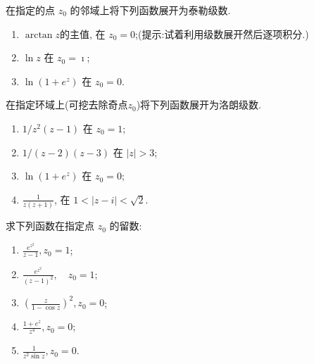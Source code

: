 \documentclass[10pt]{article}
\newenvironment{problem}[2][]{\begin{trivlist}
\item[\hskip \labelsep {\bfseries #1}\hskip \labelsep {\bfseries #2}]}{\end{trivlist}}
\begin{document}
\renewcommand{\labelenumi}{(\arabic{enumi})}
\renewcommand{\labelenumii}{(\arabic{enumi}.\arabic{enumii})}



 


\begin{problem}{4.1}
  在指定的点 $z_0$ 的邻域上将下列函数展开为泰勒级数.
  \begin{enumerate}
    \item $\arctan z$的主值, 在 $z_0=0$;(提示:试着利用级数展开然后逐项积分.)
    \item $\ln z$ 在 $z_0=\imath$;
    \item $\ln \left(1+e^z\right)$ 在 $z_0=0$.
  \end{enumerate}
\end{problem}

\begin{problem}{4.2}
  在指定环域上(可挖去除奇点$z_0$)将下列函数展开为洛朗级数.
  \begin{enumerate}
    \item$1 / z^2(z-1)$ 在 $z_0=1$;
    \item $1 /(z-2)(z-3)$ 在 $|z|>3$;
    \item $\ln \left(1+e^z\right)$ 在 $z_0=0$;
    \item $\frac{1}{z(z+1)}$, 在 $1<|z-i|<\sqrt{2}$.
  \end{enumerate}
\end{problem}

\begin{problem}{4.3}
 求下列函数在指定点 $z_0$ 的留数:

 \begin{enumerate}
  \item  $\frac{e^{z^2}}{z-1}, z_0=1$;
  \item $\frac{e^{z^2}}{(z-1)^2}, \quad z_0=1$;
  \item $\left(\frac{z}{1-\cos z}\right)^2, z_0=0$;
  \item  $\frac{1+e^z}{z^4}, z_0=0$;
  \item $\frac{1}{z^2 \sin z}, z_0=0$.
 \end{enumerate}

\end{problem}
\end{document}

